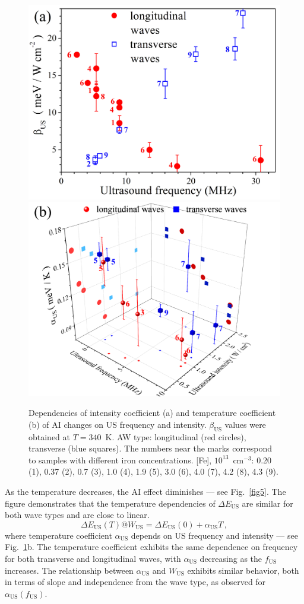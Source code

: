 \documentclass{ttp}
\begin{document}
\begin{figure}
	\centering
     \includegraphics[width=0.4\linewidth]{Fig4a.png}
     \includegraphics[width=0.4\linewidth]{Fig4b.png}
	  \caption{Dependencies of intensity coefficient (a)
       and temperature coefficient (b) of AI changes on US frequency and intensity.
       $\beta_\mathrm{US}$ values were obtained at $T=340$~K.
       AW type: longitudinal (red circles), transverse (blue squares).
       The numbers near the marks correspond to samples with different iron concentrations.
        [Fe], $10^{13}$~cm$^{-3}$: 0.20 (1), 0.37 (2), 0.7 (3), 1.0 (4), 1.9 (5), 
        3.0 (6), 4.0 (7), 4.2 (8), 4.3 (9).
}\label{fig4}
\end{figure}

As the temperature decreases, the AI effect diminishes --- see Fig.~\ref{fig5}.
The figure demonstrates that the temperature dependencies of $\Delta E_\mathrm{US}$ are similar for both wave types and are close to linear.
\begin{equation}
\label{eqEmT}
\Delta E_\mathrm{US}(T)@ W_\mathrm{US}=\Delta E_\mathrm{US}(0)+\alpha_\mathrm{US}T\,,
\end{equation}
where temperature coefficient $\alpha_\mathrm{US}$ depends on US frequency and intensity --- see Fig.~\ref{fig4}b.
The temperature coefficient exhibits the same dependence on frequency
for both transverse and longitudinal waves, with $\alpha_\mathrm{US}$ decreasing as the $f_\mathrm{US}$ increases.
The relationship between $\alpha_\mathrm{US}$ and $W_\mathrm{US}$ exhibits
similar behavior, both in terms of slope and independence from the wave type, as observed for $\alpha_\mathrm{US}(f_\mathrm{US})$.
\end{document}
